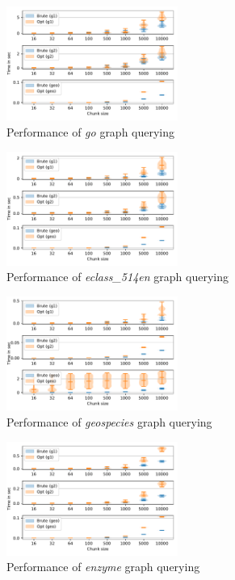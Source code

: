 \begin{figure}[h]
\centering
\includegraphics[width=0.5\textwidth]{data/raw/go.pdf}
\caption{Performance of \textit{go} graph querying}
\label{fig:python_go_all}
\end{figure}

\begin{figure}[h]
\centering
\includegraphics[width=0.5\textwidth]{data/raw/eclass_514en.pdf}
\caption{Performance of \textit{eclass\_514en} graph querying}
\label{fig:python_eclass_all}
\end{figure}

\begin{figure}[h]
\centering
\includegraphics[width=0.5\textwidth]{data/raw/geospecies.pdf}
\caption{Performance of \textit{geospecies} graph querying}
\label{fig:python_geospecies_all}
\end{figure}

\begin{figure}[h]
\centering
\includegraphics[width=0.5\textwidth]{data/raw/enzyme.pdf}
\caption{Performance of \textit{enzyme} graph querying}
\label{fig:python_enzyme_all}
\end{figure}

